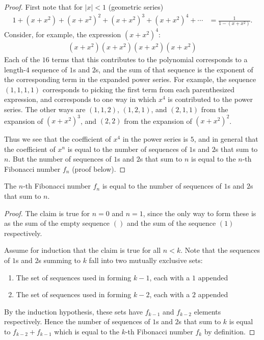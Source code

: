 \begin{lemma}
\begin{proof}
First note that for $|x| < 1$ (geometric series)
\begin{align*}
  1 + (x + x^2) + (x + x^2)^2 + (x + x^2)^3 + (x + x^2)^4 + \cdots &= \frac{1}{1 - (x + x^2)}.
\end{align*}
Consider, for example, the expression $(x + x^2)^4$:
\begin{align*}
  (x + x^2)(x + x^2)(x + x^2)(x + x^2)
\end{align*}
Each of the $16$ terms that this contributes to the polynomial corresponds to a length-$4$ sequence
of $1$s and $2$s, and the sum of that sequence is the exponent of the corresponding term in the
expanded power series. For example, the sequence $(1,1,1,1)$ corresponds to picking the first term
from each parenthesized expression, and corresponds to one way in which $x^4$ is contributed to the
power series. The other ways are $(1,1,2)$, $(1,2,1)$, and $(2,1,1)$ from the expansion
of $(x + x^2)^3$, and $(2,2)$ from the expansion of $(x + x^2)^2$.

Thus we see that the coefficient of $x^4$ in the power series is $5$, and in general that the
coefficient of $x^n$ is equal to the number of sequences of $1$s and $2$s that sum to $n$. But the
number of sequences of $1$s and $2$s that sum to $n$ is equal to the $n$-th Fibonacci number $f_n$
(proof below).
\end{proof}


\begin{claim}
 The $n$-th Fibonacci number $f_n$ is equal to the number of sequences of $1$s and $2$s that sum to $n$.
\end{claim}

\begin{proof}
  The claim is true for $n=0$ and $n=1$, since the only way to form these is as the sum of the
  empty sequence $()$ and the sum of the sequence $(1)$ respectively.

  Assume for induction that the claim is true for all $n < k$. Note that the sequences of $1$s
  and $2$s summing to $k$ fall into two mutually exclusive sets:
  \begin{enumerate}
  \item The set of sequences used in forming $k-1$, each with a $1$ appended
  \item The set of sequences used in forming $k-2$, each with a $2$ appended
  \end{enumerate}
  By the induction hypothesis, these sets have $f_{k-1}$ and $f_{k-2}$ elements respectively. Hence
  the number of sequences of $1$s and $2$s that sum to $k$ is equal to $f_{k-2} + f_{k-1}$ which is
  equal to the $k$-th Fibonacci number $f_k$ by definition.
\end{proof}


\end{lemma}
